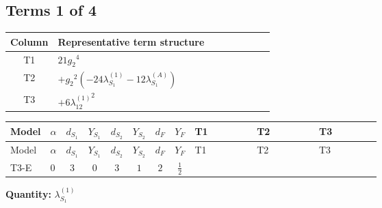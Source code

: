 \documentclass[8pt]{article}
\begin{document}
\begin{landscape}
\subsection*{Terms 1 of 4}
\begin{center}
\begin{tabular}{@{}c >{\raggedright\arraybackslash}p{0.82\linewidth}@{}}
\toprule
Column & Representative term structure \\
\midrule
T1 & \(\displaystyle 21 {g_2}^4\) \\
\midrule
T2 & \(\displaystyle +{g_2}^2 (-24 {\lambda_{S_1}^{(1)}}-12 {\lambda_{S_1}^{(A)}})\) \\
\midrule
T3 & \(\displaystyle +6 {\lambda_{12}^{(1)}}^2\) \\
\midrule
\bottomrule
\end{tabular}
\end{center}
\smallskip
\tiny
\begin{longtable}{@{}llcccccc >{\raggedright\arraybackslash}p{0.21\linewidth} >{\raggedright\arraybackslash}p{0.21\linewidth} >{\raggedright\arraybackslash}p{0.21\linewidth}@{}}
\toprule
Model & $\alpha$ & $d_{S_1}$ & $Y_{S_1}$ & $d_{S_2}$ & $Y_{S_2}$ & $d_F$ & $Y_F$ & T1 & T2 & T3 \\
\midrule
\endfirsthead
\toprule
Model & $\alpha$ & $d_{S_1}$ & $Y_{S_1}$ & $d_{S_2}$ & $Y_{S_2}$ & $d_F$ & $Y_F$ & T1 & T2 & T3 \\
\midrule
\endhead
T3-E & $0$ & $3$ & $0$ & $3$ & $1$ & $2$ & $\frac{1}{2}$ & \scriptsize\adjustbox{max width=\linewidth}{$\begin{gathered} 21 {g_2}^4\end{gathered}$} & \scriptsize\adjustbox{max width=\linewidth}{$\begin{gathered} +{g_2}^2 (-24 {\lambda_{S_1}^{(1)}}-12 {\lambda_{S_1}^{(A)}})\end{gathered}$} & \scriptsize\adjustbox{max width=\linewidth}{$\begin{gathered} +6 {\lambda_{12}^{(1)}}^2\end{gathered}$} \\
\midrule
\bottomrule
\end{longtable}
\clearpage
\noindent\textbf{Quantity: }$\lambda_{S_1}^{(1)}$\par\smallskip

\end{landscape}
\end{document}
